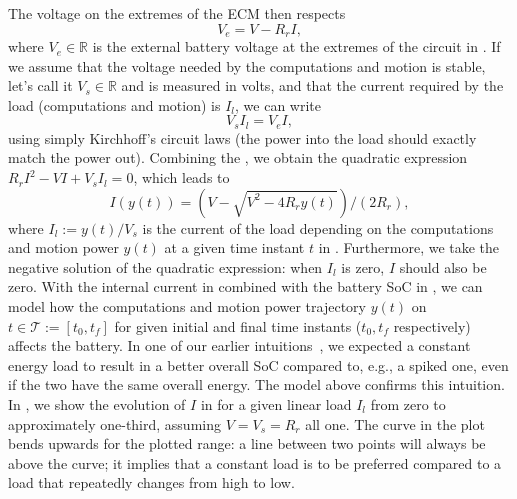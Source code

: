 The voltage on the extremes of the ECM then respects 
\begin{equation}\label{eq:tocomb1}
  V_e=V-R_rI,
\end{equation}
where $V_e\in\mathbb{R}$ is the external battery voltage at the extremes of the circuit in . If we assume that the voltage needed by the computations and motion is stable, let's call it $V_s\in\mathbb{R}$ and is measured in volts, and that the current required by the load (computations and motion) is $I_l$, we can write
\begin{equation}\label{eq:tocomb2}
  V_sI_l=V_eI,
\end{equation}
using simply Kirchhoff's circuit laws (the power into the load should exactly match the power out). Combining the , we obtain the quadratic expression $R_rI^2-VI+V_sI_l=0$, which leads to
\begin{equation}\label{eq:internal_curr}
  I(y(t))=\left(V-\sqrt{V^2-4R_ry(t)}\right)/(2R_r),
\end{equation}
where $I_l:=y(t)/V_s$ is the current of the load depending on the computations and motion power $y(t)$ at a given time instant $t$ in . Furthermore, we take the negative solution of the quadratic expression: when $I_l$ is zero, $I$ should also be zero. With the internal current in  combined with the battery SoC in , we can model how the computations and motion power trajectory $y(t)$ on $t\in\mathcal{T}:=[t_0,t_f]$ for given initial and final time instants ($t_0,t_f$ respectively) affects the battery. In one of our earlier intuitions~\citep{seewald2019coarse}, we expected a constant energy load to result in a better overall SoC compared to, e.g., a spiked one, even if the two have the same overall energy. The model above confirms this intuition. In , we show the evolution of $I$ in  for a given linear load $I_l$ from zero to approximately one-third, assuming $V=V_s=R_r$ all one. The curve in the plot bends upwards for the plotted range: a line between two points will always be above the curve; it implies that a constant load is to be preferred compared to a load that repeatedly changes from high to low.

